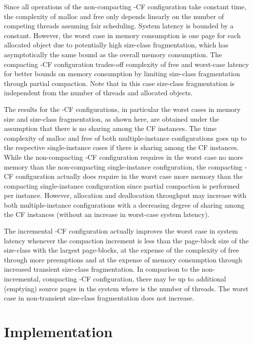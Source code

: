 \documentclass{amsart}
\begin{document}
Since all operations of the non-compacting -CF
configuration take constant time, the complexity of malloc and free
only depends linearly on the number of competing threads assuming fair
scheduling.  System latency is bounded by a constant.  However, the
worst case in memory consumption is one page for each allocated object
due to potentially high size-class fragmentation, which has
asymptotically the same bound as the overall memory consumption.  The
compacting -CF configuration trades-off complexity
of free and worst-case latency for better bounds on memory consumption
by limiting size-class fragmentation through partial compaction.  Note
that in this case size-class fragmentation is independent from the
number of threads and allocated objects.

The results for the -CF configurations, in particular the worst
cases in memory size and size-class fragmentation, as shown here, are
obtained under the assumption that there is no sharing among the 
CF instances.  The time complexity of malloc and free of both
multiple-instance configurations goes up to the respective
single-instance cases if there is sharing among the  CF instances.
While the non-compacting -CF configuration
requires in the worst case no more memory than the non-compacting
single-instance configuration, the compacting -CF
configuration actually does require in the worst case more memory than
the compacting single-instance configuration since partial compaction
is performed per instance.  However, allocation and deallocation
throughput may increase with both multiple-instance configurations
with a decreasing degree of sharing among the  CF instances
(without an increase in worst-case system latency).

The incremental -CF configuration actually improves
the worst case in system latency whenever the compaction increment
 is less than the page-block size of the size-class with the
largest page-blocks, at the expense of the complexity of free through
more preemptions and at the expense of memory consumption through
increased transient size-class fragmentation.  In comparison to the
non-incremental, compacting -CF configuration,
there may be up to  additional (emptying) source pages in the
system where  is the number of threads.  The worst case in
non-transient size-class fragmentation does not increase.

\section{Implementation}
\label{sec:impl}
\end{document}
